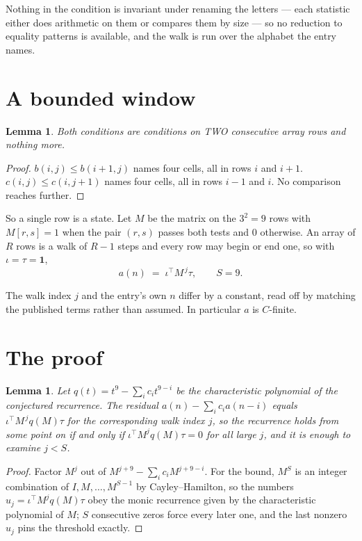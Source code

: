 \documentclass[11pt,a4paper]{article}
\theoremstyle{plain}
\newtheorem{lemma}[theorem]{Lemma}
\theoremstyle{definition}
\begin{document}
Nothing in the condition is invariant under renaming the letters --- each statistic either does
arithmetic on them or compares them by size --- so no reduction to equality patterns is
available, and the walk is run over the alphabet the entry names.

\section{A bounded window}

\begin{lemma}\label{lem:win}
Both conditions are conditions on TWO consecutive array rows and nothing more.
\end{lemma}

\begin{proof}
$b(i,j)\le b(i{+}1,j)$ names four cells, all in rows $i$ and $i+1$. $c(i,j)\le c(i,j{+}1)$
names four cells, all in rows $i-1$ and $i$. No comparison reaches further.
\end{proof}

So a single row is a state. Let $M$ be the matrix on the $3^{2}=9$ rows with
$M[r,s]=1$ when the pair $(r,s)$ passes both tests and $0$ otherwise. An array of $R$ rows is a
walk of $R-1$ steps and every row may begin or end one, so with $\iota=\tau=\mathbf{1}$,
\[
a(n)\;=\;\iota^{\!\top}M^{\,j}\tau ,\qquad S=9.
\]

The walk index $j$ and the entry's own $n$ differ by a constant, read off by matching the
published terms rather than assumed. In particular $a$ is $C$-finite.

\section{The proof}

\begin{lemma}\label{lem:crit}
Let $q(t)=t^{9}-\sum_i c_it^{9-i}$ be the characteristic polynomial of the
conjectured recurrence. The residual $a(n)-\sum_ic_ia(n-i)$ equals
$\iota^{\!\top}M^{\,j}q(M)\tau$ for the corresponding walk index $j$, so the recurrence
holds from some point on if and only if $\iota^{\!\top}M^{j}q(M)\tau=0$ for all large $j$,
and it is enough to examine $j<S$.
\end{lemma}

\begin{proof}
Factor $M^{j}$ out of $M^{j+9}-\sum_ic_iM^{j+9-i}$. For the bound, $M^{S}$
is an integer combination of $I,M,\dots,M^{S-1}$ by Cayley--Hamilton, so the numbers
$u_j=\iota^{\!\top}M^{j}q(M)\tau$ obey the monic recurrence given by the characteristic
polynomial of $M$; $S$ consecutive zeros force every later one, and the last nonzero $u_j$
pins the threshold exactly.
\end{proof}
\end{document}
